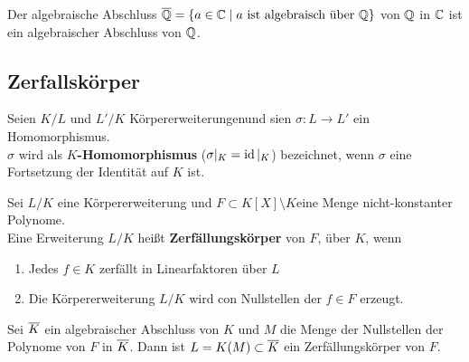  	\begin{exm}
 		Der algebraische Abschluss $\overline{\mathbb{Q}}=\{a\in\mathbb{C}\mid\text{$a$ ist algebraisch über $\mathbb{Q}$}\}$ von $\mathbb{Q}$ in $\mathbb{C}$ ist ein algebraischer Abschluss von $\mathbb{Q}$.
 	\end{exm}


 

\subsection{Zerfallskörper}
	
	\begin{definition}
		Seien $K/L$ und $L'/K$ Körpererweiterungenund sien $\sigma:L\to L'$ ein Homomorphismus.\\
		$\sigma$ wird als \textbf{$K$-Homomorphismus} ($\sigma|_K=\operatorname{id}|_K$) bezeichnet, wenn $\sigma$ eine Fortsetzung der Identität auf $K$ ist.
	\end{definition}

	\begin{definition}
		Sei $L/K$ eine Körpererweiterung und $F\subset K[X]\setminus K$eine Menge nicht-konstanter Polynome.\\
		Eine Erweiterung $L/K$ heißt \textbf{Zerfällungskörper} von $F$, über $K$, wenn
		\begin{enumerate}
			\item Jedes $f\in K$ zerfällt in Linearfaktoren über $L$
			\item Die Körpererweiterung $L/K$ wird con Nullstellen der $f\in F$ erzeugt.
		\end{enumerate}
	\end{definition}

	\begin{lem}
		Sei $\overline{K}$ ein algebraischer Abschluss von $K$ und $M$ die Menge der Nullstellen der Polynome von $F$ in $\overline{K}$. Dann ist $L=K(M)\subset \overline{K}$ ein Zerfällungskörper von $F$.
	\end{lem}

